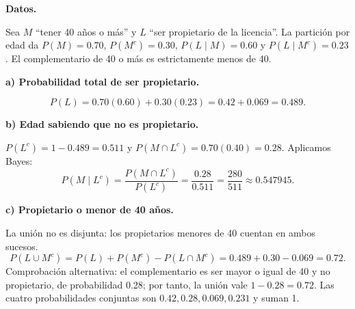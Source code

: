 \textbf{Datos.}\par\nopagebreak[4]
Sea $M$ ``tener 40 años o más'' y $L$ ``ser propietario de la licencia''. La partición por edad da $P(M)=0.70$, $P(M^c)=0.30$, $P(L\mid M)=0.60$ y $P(L\mid M^c)=0.23$. El complementario de 40 o más es estrictamente menos de 40.

\textbf{a) Probabilidad total de ser propietario.}\par\nopagebreak[4]
\[
P(L)=0.70(0.60)+0.30(0.23)=0.42+0.069=\boxed{0.489}.
\]

\textbf{b) Edad sabiendo que no es propietario.}\par\nopagebreak[4]
$P(L^c)=1-0.489=0.511$ y $P(M\cap L^c)=0.70(0.40)=0.28$. Aplicamos Bayes:
\[
P(M\mid L^c)=\frac{P(M\cap L^c)}{P(L^c)}
=\frac{0.28}{0.511}=\boxed{\frac{280}{511}\approx0.547945}.
\]

\textbf{c) Propietario o menor de 40 años.}\par\nopagebreak[4]
La unión no es disjunta: los propietarios menores de 40 cuentan en ambos sucesos.
\[
P(L\cup M^c)=P(L)+P(M^c)-P(L\cap M^c)
=0.489+0.30-0.069=\boxed{0.72}.
\]
Comprobación alternativa: el complementario es ser mayor o igual de 40 y no propietario, de probabilidad 0.28; por tanto, la unión vale $1-0.28=0.72$. Las cuatro probabilidades conjuntas son $0.42,0.28,0.069,0.231$ y suman 1.
